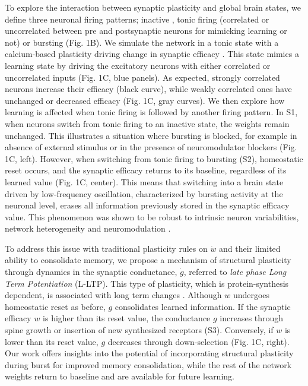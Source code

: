 To explore the interaction between synaptic plasticity and global brain states, we define three neuronal firing patterns; inactive , tonic firing (correlated or uncorrelated between pre and postsynaptic neurons for mimicking learning or not) or bursting (Fig. 1B). We simulate the network in a tonic state with a calcium-based plasticity driving change in synaptic efficacy \citep{graupner_natural_2016}. This state mimics a learning state by driving the excitatory neurons with either correlated or uncorrelated inputs (Fig. 1C, blue panels). As expected, strongly correlated neurons increase their efficacy (black curve), while weakly correlated ones have unchanged or decreased efficacy (Fig. 1C, gray curves). We then explore how learning is affected when tonic firing is followed by another firing pattern. In S1, when neurons switch from tonic firing to an inactive state, the weights remain unchanged. This illustrates a situation where bursting is blocked, for example in absence of external stimulus or in the presence of neuromodulator blockers (Fig. 1C, left). However, when switching from tonic firing to bursting (S2), homeostatic reset occurs, and the synaptic efficacy returns to its baseline, regardless of its learned value (Fig. 1C, center). This means that switching into a brain state driven by low-frequency oscillation, characterized by bursting activity at the neuronal level, erases all information previously stored in the synaptic efficacy value. This phenomenon was shown to be robust to intrinsic neuron variabilities, network heterogeneity and neuromodulation \citep{jacquerie_switches_2022}.


To address this issue with traditional plasticity rules on $\dot{w}$ and their limited ability to consolidate memory, we propose a mechanism of structural plasticity through dynamics in the synaptic conductance, $\dot{g}$, referred to \textit{late phase Long Term Potentiation} (L-LTP). This type of plasticity, which is protein-synthesis dependent, is associated with long term changes \citep{lamprecht_structural_2004, abraham_is_2019}. Although $w$ undergoes homeostatic reset as before, $g$ consolidates learned information. If the synaptic efficacy $w$ is higher than its reset value, the conductance $g$ increases through spine growth or insertion of new synthesized receptors (S3). Conversely, if $w$ is lower than its reset value, $g$ decreases through down-selection (Fig. 1C, right). Our work offers insights into the potential of incorporating structural plasticity during burst for improved memory consolidation, while the rest of the network weights return to baseline and are available for future learning. 



